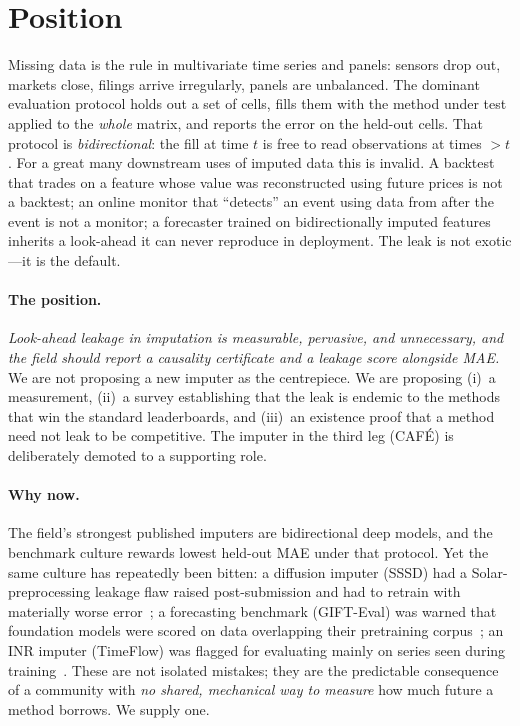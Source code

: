 \documentclass[10pt,twocolumn]{article}
\newcommand{\cafe}{CAF\'E}
\begin{document}
\section{Position}\label{sec:position}
Missing data is the rule in multivariate time series and panels: sensors drop
out, markets close, filings arrive irregularly, panels are unbalanced. The
dominant evaluation protocol holds out a set of cells, fills them with the method
under test applied to the \emph{whole} matrix, and reports the error on the
held-out cells. That protocol is \emph{bidirectional}: the fill at time $t$ is
free to read observations at times $>t$. For a great many downstream uses of
imputed data this is invalid. A backtest that trades on a feature whose value was
reconstructed using future prices is not a backtest; an online monitor that
``detects'' an event using data from after the event is not a monitor; a
forecaster trained on bidirectionally imputed features inherits a look-ahead it
can never reproduce in deployment. The leak is not exotic---it is the default.

\paragraph{The position.} \emph{Look-ahead leakage in imputation is measurable,
pervasive, and unnecessary, and the field should report a causality certificate
and a leakage score alongside MAE.} We are not proposing a new imputer as the
centrepiece. We are proposing (i)~a measurement, (ii)~a survey establishing that
the leak is endemic to the methods that win the standard leaderboards, and
(iii)~an existence proof that a method need not leak to be competitive. The
imputer in the third leg (\cafe{}) is deliberately demoted to a supporting role.

\paragraph{Why now.} The field's strongest published imputers are bidirectional
deep models, and the benchmark culture rewards lowest held-out MAE under that
protocol. Yet the same culture has repeatedly been bitten: a diffusion imputer
(SSSD) had a Solar-preprocessing leakage flaw raised post-submission and had to
retrain with materially worse error~\cite{sssd2022,du2024tsibench}; a forecasting
benchmark (GIFT-Eval) was warned that foundation models were scored on data
overlapping their pretraining corpus~\cite{gifteval2024}; an INR imputer
(TimeFlow) was flagged for evaluating mainly on series seen during
training~\cite{timeflow2024}. These are not isolated mistakes; they are the
predictable consequence of a community with \emph{no shared, mechanical way to
measure} how much future a method borrows. We supply one.
\end{document}
